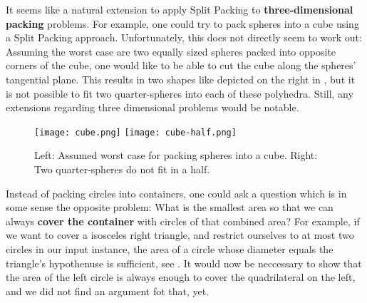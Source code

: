\documentclass[a4paper,style=print,oneside,bibliography=totoc,nexus,lnum,extramargin]{tubsbook}
\begin{document}

It seems like a natural extension to apply Split Packing to \textbf{three-dimensional packing} problems. For example, one could try to pack spheres into a cube using a Split Packing approach. Unfortunately, this does not directly seem to work out: Assuming the worst case are two equally sized spheres packed into opposite corners of the cube, one would like to be able to cut the cube along the spheres' tangential plane. This results in two shapes like depicted on the right in , but it is not possible to fit two quarter-spheres into each of these polyhedra. Still, any extensions regarding three dimensional problems would be notable.

\begin{figure}
    \texttt{[image: cube.png]}
    \texttt{[image: cube-half.png]}
    \caption{Left: Assumed worst case for packing spheres into a cube. Right: Two quarter-spheres do not fit in a half.}\label{fig:cube-half}
\end{figure}

Instead of packing circles into containers, one could ask a question which is in some sense the opposite problem: What is the smallest area so that we can always \textbf{cover the container} with circles of that combined area? For example, if we want to cover a isosceles right triangle, and restrict ourselves to at most two circles in our input instance, the area of a circle whose diameter equals the triangle's hypothenuse is sufficient, see . It would now be neccessary to show that the area of the left circle is always enough to cover the quadrilateral on the left, and we did not find an argument fot that, yet.


\printbibliography
\end{document}
